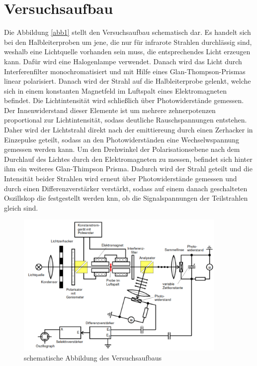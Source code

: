 \section{Versuchsaufbau}
\label{sec:Durchführung}

Die Abbildung \ref{abb1} stellt den Versuchsaufbau schematisch dar.
Es handelt sich bei den Halbleiterproben um jene, die nur 
für infrarote Strahlen durchlässig sind, weshalb eine Lichtquelle vorhanden sein 
muss, die entsprechendes Licht erzeugen kann.
Dafür wird eine Halogenlampe verwendet. 
Danach wird das Licht durch Interferenfilter monochromatisiert und mit Hilfe eines 
Glan-Thompson-Prismas linear polarisiert. Danach wird der Strahl auf die 
Halbleiterprobe gelenkt, welche sich in einem konstanten Magnetfeld im Luftspalt 
eines Elektromagneten befindet. Die Lichtintensität wird schließlich über 
Photowiderstände gemessen. Der Innenwiderstand dieser Elemente ist um mehrere 
zehnerpotenzen proportional zur Lichtintensität, sodass deutliche 
Rauschspannungen entstehen. Daher wird der Lichtstrahl direkt nach der 
emittiereung durch einen Zerhacker in Einzepulse geteilt, sodass an den 
Photowiderständen eine Wechselwspannung gemessen werden kann. 
Um den Drehwinkel der Polarisationsebene nach dem Durchlauf des Lichtes durch den 
Elektromagneten zu messen, befindet sich hinter ihm ein weiteres Glan-Thimpson Prisma.
Dadurch wird der Strahl geteilt und die Intensität beider Strahlen wird erneut 
über Photowiderstände gemessen und durch einen Differenzverstärker verstärkt,
sodass auf einem danach geschalteten Oszillskop die festgestellt werden knn, ob die 
Signalspannungen der Teilstrahlen gleich sind.

\begin{figure}
    \centering
    \includegraphics[width=0.9\textwidth]{figure/Aufbau.pdf}
    \caption{schematische Abbildung des Versuchsaufbaus}
    \label{abb2}
\end{figure}

